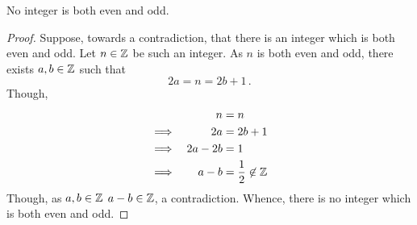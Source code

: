 \guard




\begin{prop}
\label{prop:noIntegerBothEvenAndOdd}
  No integer is both even and odd.
\end{prop}
\begin{proof}
  Suppose, towards a contradiction, that there is an integer which is both even and odd.
  Let $n\in\mathbb{Z}$ be such an integer.
  As $n$ is both even and odd, there exists $a,b\in\mathbb{Z}$ such that \[ 2a=n=2b+1\,.\]
  Though,
  \begin{align*}
              && n &=n \\
    \implies  && 2a &= 2b + 1 \\
    \implies  && 2a-2b &= 1 \\
    \implies  && a-b &= \frac{1}{2}\not\in\mathbb{Z}
  \end{align*}
  Though, as $a,b\in\mathbb{Z}$ $a-b\in\mathbb{Z}$, a contradiction.
  Whence, there is no integer which is both even and odd.  
\end{proof}
